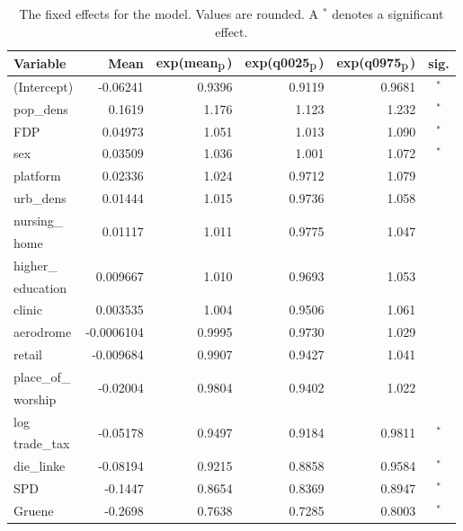 \begin{table}[H]
\caption{The fixed effects for the model. Values are rounded. A $^*$ denotes a significant effect. \label{FixedAllGermany_nospatial}}
\begin{tabular}{l r r r r c}
\toprule
\textbf{Variable}	& \textbf{Mean}	& \textbf{exp(mean$_{\hbox{p}}$)} & \textbf{exp(q0025$_{\hbox{p}}$)} & \textbf{exp(q0975$_{\hbox{p}}$)} & \textbf{sig.}\\
\midrule
(Intercept) & -0.06241 & 0.9396 & 0.9119 & 0.9681 & $^*$\\
pop\_dens & 0.1619 & 1.176 & 1.123 & 1.232 & $^*$\\
FDP & 0.04973 & 1.051 & 1.013 & 1.090 & $^*$\\
sex & 0.03509 & 1.036 & 1.001 & 1.072 & $^*$\\
platform & 0.02336 & 1.024 & 0.9712 & 1.079 \\
urb\_dens & 0.01444 & 1.015 & 0.9736 & 1.058 \\
nursing\_ & \multirow{2}{*}{0.01117} & \multirow{2}{*}{1.011} & \multirow{2}{*}{0.9775} & \multirow{2}{*}{1.047} \\
home\\
higher\_ & \multirow{2}{*}{0.009667} & \multirow{2}{*}{1.010} & \multirow{2}{*}{0.9693} & \multirow{2}{*}{1.053} \\
education\\
clinic & 0.003535 & 1.004 & 0.9506 & 1.061 \\
aerodrome & -0.0006104 & 0.9995 & 0.9730 & 1.029 \\
retail & -0.009684 & 0.9907 & 0.9427 & 1.041 \\
place\_of\_ & \multirow{2}{*}{-0.02004} & \multirow{2}{*}{0.9804} & \multirow{2}{*}{0.9402} & \multirow{2}{*}{1.022} \\
worship\\
log & \multirow{2}{*}{-0.05178} & \multirow{2}{*}{0.9497} & \multirow{2}{*}{0.9184} & \multirow{2}{*}{0.9811} & \multirow{2}{*}{$^*$}\\
trade\_tax \\
die\_linke & -0.08194 & 0.9215 & 0.8858 & 0.9584 & $^*$\\
SPD & -0.1447 & 0.8654 & 0.8369 & 0.8947 & $^*$\\
Gruene & -0.2698 & 0.7638 & 0.7285 & 0.8003 & $^*$\\
\bottomrule
\end{tabular}
\end{table}
